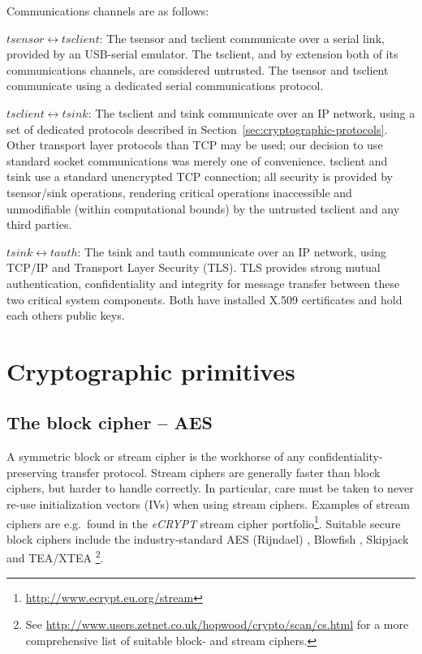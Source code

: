 Communications channels are as follows:
%
\begin{description}
\item {$tsensor \longleftrightarrow tsclient$:}
The tsensor and tsclient communicate over a serial link, provided by an USB-serial emulator. The tsclient, and by extension both of its communications channels, are considered untrusted. The tsensor and tsclient communicate using a dedicated serial communications protocol.

\item {$tsclient \longleftrightarrow tsink$:}
The tsclient and tsink communicate over an IP network, using a set of dedicated protocols described in Section~\ref{sec:cryptographic-protocols}. Other transport layer protocols than TCP may be used; our decision to use standard socket communications was merely one of convenience. 
tsclient and tsink use a standard unencrypted TCP connection; all security is provided by tsensor/sink operations, rendering critical operations inaccessible and unmodifiable (within computational bounds) by the untrusted tsclient and any third parties.

\item {$tsink \longleftrightarrow tauth$:}
The tsink and tauth communicate over an IP network, using TCP/IP and Transport Layer Security (TLS). TLS provides strong mutual authentication, confidentiality and integrity for message transfer between these two critical system components. Both have installed X.509 certificates and hold each others public keys.

\end{description}

\section{Cryptographic primitives}
\label{sec:crypt-prim}

\subsection{The block cipher -- AES}
\label{sec:block-ciphher-aes}

A symmetric block or stream cipher is the workhorse of any confidentiality-preserving transfer protocol. 
%
Stream ciphers are generally faster than block ciphers, but harder to handle correctly. In particular, care must be taken to never re-use initialization vectors (IVs) when using stream ciphers. Examples of stream ciphers are e.g.\ found in the \textit{eCRYPT} stream cipher portfolio\footnote{\url{http://www.ecrypt.eu.org/stream}}. 
%
Suitable secure block ciphers include the industry-standard AES (Rijndael) , Blowfish , Skipjack  and TEA/XTEA \footnote{See  \url{http://www.users.zetnet.co.uk/hopwood/crypto/scan/cs.html} for a more comprehensive list of suitable block- and stream ciphers.}.

